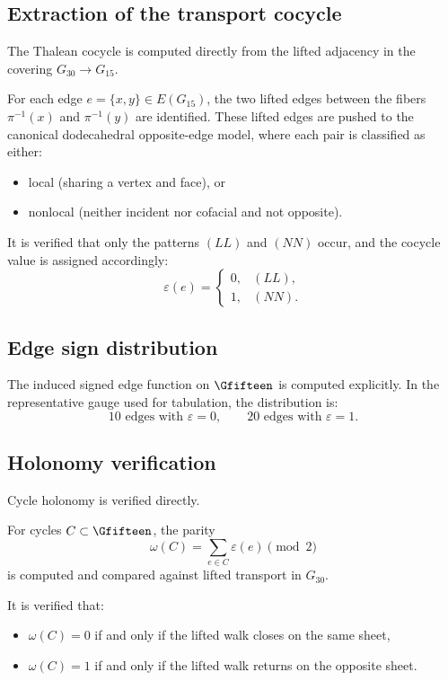 \subsection{Extraction of the transport cocycle}

The Thalean cocycle is computed directly from the lifted adjacency in
the covering $G_{30} \to G_{15}$.

For each edge $e=\{x,y\}\in E(G_{15})$, the two lifted edges between the
fibers $\pi^{-1}(x)$ and $\pi^{-1}(y)$ are identified. These lifted edges
are pushed to the canonical dodecahedral opposite-edge model, where each
pair is classified as either:

\begin{itemize}
\item local (sharing a vertex and face), or
\item nonlocal (neither incident nor cofacial and not opposite).
\end{itemize}

It is verified that only the patterns $(LL)$ and $(NN)$ occur, and the
cocycle value is assigned accordingly:
\[
\varepsilon(e)=
\begin{cases}
0,&(LL),\\
1,&(NN).
\end{cases}
\]

\subsection{Edge sign distribution}

The induced signed edge function on $\Gfifteen$ is computed explicitly.
In the representative gauge used for tabulation, the distribution is:
\[
10 \text{ edges with } \varepsilon=0,\qquad
20 \text{ edges with } \varepsilon=1.
\]

\subsection{Holonomy verification}

Cycle holonomy is verified directly.

For cycles $C \subset \Gfifteen$, the parity
\[
\omega(C)=\sum_{e\in C}\varepsilon(e)\pmod 2
\]
is computed and compared against lifted transport in $G_{30}$.

It is verified that:
\begin{itemize}
\item $\omega(C)=0$ if and only if the lifted walk closes on the same sheet,
\item $\omega(C)=1$ if and only if the lifted walk returns on the opposite sheet.
\end{itemize}

